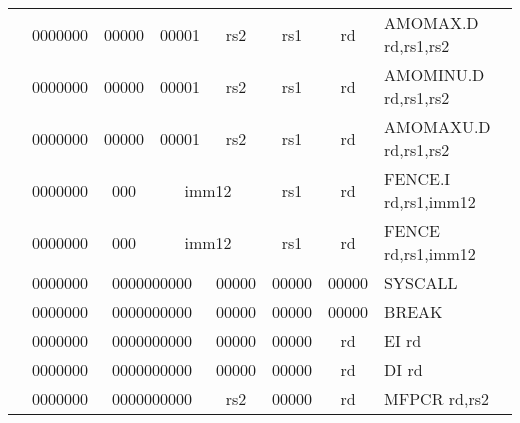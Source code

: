 \begin{table}[p]
\begin{small}
\begin{center}
\begin{tabular}{rcccccccccl}
&
\multicolumn{1}{|c|}{0000000} &
\multicolumn{3}{c|}{00000} &
\multicolumn{2}{c|}{00001} &
\multicolumn{1}{c|}{rs2} &
\multicolumn{1}{c|}{rs1} &
\multicolumn{1}{c|}{rd} & AMOMAX.D rd,rs1,rs2 \\
\cline{2-10}
  

&
\multicolumn{1}{|c|}{0000000} &
\multicolumn{3}{c|}{00000} &
\multicolumn{2}{c|}{00001} &
\multicolumn{1}{c|}{rs2} &
\multicolumn{1}{c|}{rs1} &
\multicolumn{1}{c|}{rd} & AMOMINU.D rd,rs1,rs2 \\
\cline{2-10}
  

&
\multicolumn{1}{|c|}{0000000} &
\multicolumn{3}{c|}{00000} &
\multicolumn{2}{c|}{00001} &
\multicolumn{1}{c|}{rs2} &
\multicolumn{1}{c|}{rs1} &
\multicolumn{1}{c|}{rd} & AMOMAXU.D rd,rs1,rs2 \\
\cline{2-10}
  

&
\multicolumn{1}{|c|}{0000000} &
\multicolumn{2}{c|}{000} &
\multicolumn{4}{c|}{imm12} &
\multicolumn{1}{c|}{rs1} &
\multicolumn{1}{c|}{rd} & FENCE.I rd,rs1,imm12 \\
\cline{2-10}
  

&
\multicolumn{1}{|c|}{0000000} &
\multicolumn{2}{c|}{000} &
\multicolumn{4}{c|}{imm12} &
\multicolumn{1}{c|}{rs1} &
\multicolumn{1}{c|}{rd} & FENCE rd,rs1,imm12 \\
\cline{2-10}
  

&
\multicolumn{1}{|c|}{0000000} &
\multicolumn{5}{c|}{0000000000} &
\multicolumn{1}{c|}{00000} &
\multicolumn{1}{c|}{00000} &
\multicolumn{1}{c|}{00000} & SYSCALL  \\
\cline{2-10}
  

&
\multicolumn{1}{|c|}{0000000} &
\multicolumn{5}{c|}{0000000000} &
\multicolumn{1}{c|}{00000} &
\multicolumn{1}{c|}{00000} &
\multicolumn{1}{c|}{00000} & BREAK  \\
\cline{2-10}
  

&
\multicolumn{1}{|c|}{0000000} &
\multicolumn{5}{c|}{0000000000} &
\multicolumn{1}{c|}{00000} &
\multicolumn{1}{c|}{00000} &
\multicolumn{1}{c|}{rd} & EI rd \\
\cline{2-10}
  

&
\multicolumn{1}{|c|}{0000000} &
\multicolumn{5}{c|}{0000000000} &
\multicolumn{1}{c|}{00000} &
\multicolumn{1}{c|}{00000} &
\multicolumn{1}{c|}{rd} & DI rd \\
\cline{2-10}
  

&
\multicolumn{1}{|c|}{0000000} &
\multicolumn{5}{c|}{0000000000} &
\multicolumn{1}{c|}{rs2} &
\multicolumn{1}{c|}{00000} &
\multicolumn{1}{c|}{rd} & MFPCR rd,rs2 \\
\cline{2-10}
  


\end{tabular}
\end{center}
\end{small}
\end{table}

